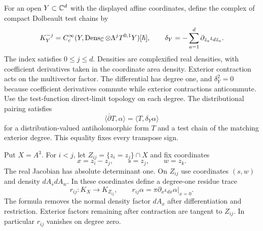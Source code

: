 For an open $Y\subset\mathbb C^d$ with the displayed affine coordinates, define
the complex of compact Dolbeault test chains by
\begin{equation}
\label{eq:cc-test-differential}
 K_Y^{-j}=C_c^\infty(Y,\operatorname{Dens}_{\mathbb C}
             \otimes\Lambda^j T^{0,1}Y)[\hbar],\qquad
 \delta_Y=-\sum_{a=1}^d\partial_{\bar z_a}\iota_{d\bar z_a}.
\end{equation}
The index satisfies $0\le j\le d$.  Densities are complexified real
densities, with coefficient derivatives taken in the coordinate area
density.  Exterior contraction acts on the multivector factor.
The differential has degree one, and $\delta_Y^2=0$ because coefficient
derivatives commute while exterior contractions anticommute.
Use the test-function direct-limit topology on each degree.
The distributional pairing satisfies
\[
 \langle\bar\partial T,\alpha\rangle
       =\langle T,\delta_Y\alpha\rangle
\]
for a distribution-valued antiholomorphic form $T$ and a test chain of
the matching exterior degree.  This equality fixes every transpose sign.

Put $X=A^3$.  For $i<j$, let $Z_{ij}=\{z_i=z_j\}\cap X$ and fix
coordinates
\[
 x=z_i-z_j,\qquad s=z_j,\qquad w=z_k.
\]
The real Jacobian has absolute determinant one.  On $Z_{ij}$ use
coordinates $(s,w)$ and density $dA_s dA_w$.
In these coordinates define a degree-one residue trace
\begin{equation}
\label{eq:cc-residue-trace}
 r_{ij}:K_X\longrightarrow K_{Z_{ij}},\qquad
 r_{ij}\alpha=
 \left.\pi\partial_x\iota_{d\bar x}\alpha\right|_{x=0}.
\end{equation}
The formula removes the normal density factor $dA_x$ after differentiation
and restriction.  Exterior factors remaining after contraction are
tangent to $Z_{ij}$.  In particular $r_{ij}$ vanishes on degree zero.

